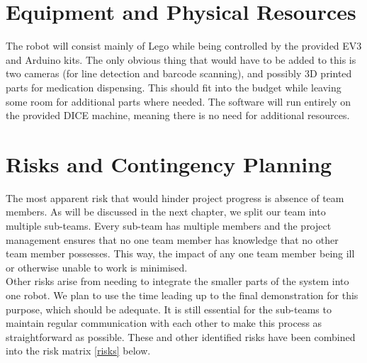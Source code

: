 \documentclass[a4paper,10pt,DIV10,openright,openbib]{scrreprt}
\begin{document}
\section{Equipment and Physical Resources}
The robot will consist mainly of Lego while being controlled by the provided EV3 and Arduino kits. 
The only obvious thing that would have to be added to this is two cameras (for line detection and 
barcode scanning), and possibly 3D printed parts for medication dispensing. This should fit into 
the budget while leaving some room for additional parts where needed.
The software will run entirely on the provided DICE machine, meaning there is no need for additional
 resources.

\section{Risks and Contingency Planning}
The most apparent risk that would hinder project progress is absence of team members. 
As will be discussed in the next chapter, we split our team into multiple sub-teams. 
Every sub-team has multiple members and the project management ensures that no 
one team member has knowledge that no other 
team member possesses. This way, the impact of any one team member being ill or 
otherwise unable to work is minimised.\\
Other risks arise from needing to integrate 
the smaller parts of the system into one robot. We plan to use the time leading up to the final demonstration 
for this purpose, which should be adequate. It is still essential for the 
sub-teams to maintain regular communication with each other to make this process
as straightforward as possible. These and other identified risks have been
combined into the risk matrix \ref{risks} below.
\end{document}
